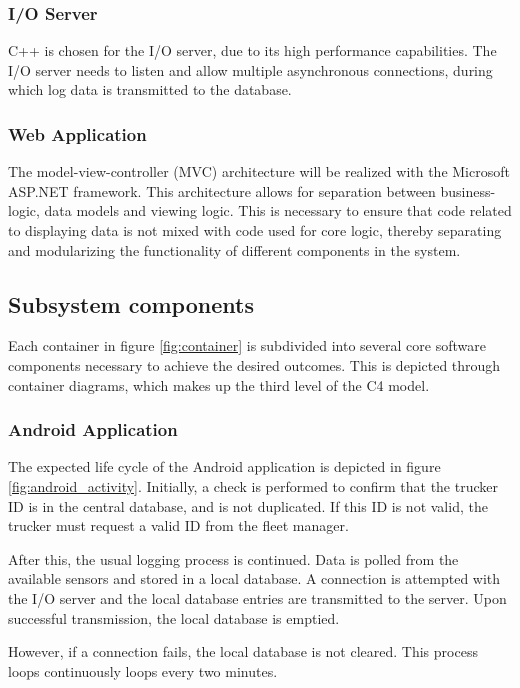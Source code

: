 \subsubsection{I/O Server}
C++ is chosen for the I/O server, due to its high performance capabilities.
The I/O server needs to listen and allow multiple asynchronous connections, during which log data is transmitted to the database.

\subsubsection{Web Application}
The model-view-controller (MVC) architecture will be realized with the Microsoft ASP.NET framework.
This architecture allows for separation between business-logic, data models and viewing logic.
This is necessary to ensure that code related to displaying data is not mixed with code used for core logic, thereby separating and modularizing the functionality of different components in the system.

\subsection{Subsystem components}
Each container in figure \ref{fig:container} is subdivided into several core software components necessary to achieve the desired outcomes.
This is depicted through container diagrams, which makes up the third level of the C4 model.

\subsubsection{Android Application}
The expected life cycle of the Android application is depicted in figure \ref{fig:android_activity}.
Initially, a check is performed to confirm that the trucker ID is in the central database, and is not duplicated.
If this ID is not valid, the trucker must request a valid ID from the fleet manager.

After this, the usual logging process is continued.
Data is polled from the available sensors and stored in a local database.
A connection is attempted with the I/O server and the local database entries are transmitted to the server.
Upon successful transmission, the local database is emptied.

However, if a connection fails, the local database is not cleared.
This process loops continuously loops every two minutes.
 
